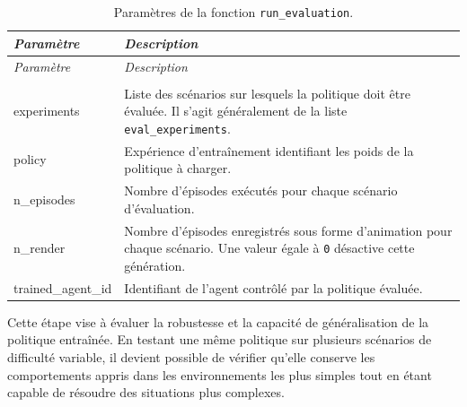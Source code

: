 \begin{longtable}{
        >{\ttfamily\small}p{}
        p{}
    }
    \caption{Paramètres de la fonction \texttt{run\_evaluation}.}
    \label{tab:run_evaluation_parameters}                                                                                                                                  \\

    \toprule
    \textnormal{\textit{Paramètre}} & \textit{Description}                                                                                                                 \\
    \midrule
    \endfirsthead

    \toprule
    \textnormal{\textit{Paramètre}} & \textit{Description}                                                                                                                 \\
    \midrule
    \endhead

    \midrule
    \\
    \endfoot

    \bottomrule
    \endlastfoot

    experiments

                                    & Liste des scénarios sur lesquels la politique doit être évaluée. Il s'agit généralement de la liste \texttt{eval\_experiments}.      \\

    policy

                                    & Expérience d'entraînement identifiant les poids de la politique à charger.                                                           \\

    n\_episodes

                                    & Nombre d'épisodes exécutés pour chaque scénario d'évaluation.                                                                        \\

    n\_render
                                    & Nombre d'épisodes enregistrés sous forme d'animation pour chaque scénario. Une valeur égale à \texttt{0} désactive cette génération. \\

    trained\_agent\_id

                                    & Identifiant de l'agent contrôlé par la politique évaluée.                                                                            \\
\end{longtable}

\noindent Cette étape vise à évaluer la robustesse et la capacité de généralisation de la politique entraînée. En testant une même politique sur plusieurs scénarios de difficulté variable, il devient possible de vérifier qu'elle conserve les comportements appris dans les environnements les plus simples tout en étant capable de résoudre des situations plus complexes.
